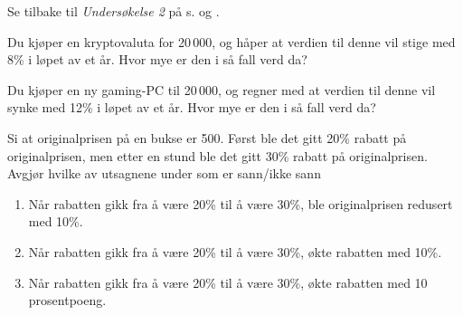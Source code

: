 Se tilbake til \textsl{Undersøkelse 2} på s. \pageref{undersok} og \pageref{sektorund2}. 

 \vs
{}

 \vs
{}
Du kjøper en kryptovaluta for 20\,000, og håper at verdien til denne vil stige med 8\% i løpet av et år. Hvor mye er den i så fall verd da?

Du kjøper en ny gaming-PC til 20\,000, og regner med at verdien til denne vil synke med 12\% i løpet av et år. Hvor mye er den i så fall verd da?

Si at originalprisen på en bukse er 500. Først ble det gitt 20\% rabatt på originalprisen, men etter en stund ble det gitt 30\% rabatt på originalprisen. Avgjør hvilke av utsagnene under som er sann/ikke sann
\begin{enumerate}[label=(\roman*)]
	\item Når rabatten gikk fra å være 20\% til å være 30\%, ble originalprisen redusert med 10\%.
	\item Når rabatten gikk fra å være 20\% til å være 30\%, økte rabatten med 10\%.
	\item Når rabatten gikk fra å være 20\% til å være 30\%, økte rabatten med 10 prosentpoeng.	
\end{enumerate}

\nes

 \vs
{}

